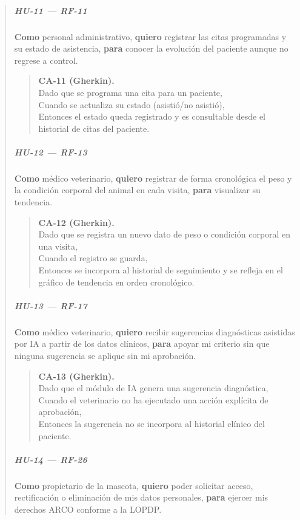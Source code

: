 \documentclass[
]{article}
\begin{document}
\begin{quote}
\subparagraph{HU-11 --- RF-11}
\textbf{Como} personal administrativo,
\textbf{quiero} registrar las citas programadas y su estado de asistencia,
\textbf{para} conocer la evolución del paciente aunque no regrese a control.

\begin{quote}
\textbf{CA-11 (Gherkin).} \\
Dado que se programa una cita para un paciente, \\
Cuando se actualiza su estado (asistió/no asistió), \\
Entonces el estado queda registrado y es consultable desde el historial de citas del paciente.
\end{quote}

\subparagraph{HU-12 --- RF-13}
\textbf{Como} médico veterinario,
\textbf{quiero} registrar de forma cronológica el peso y la condición corporal del animal en cada visita,
\textbf{para} visualizar su tendencia.

\begin{quote}
\textbf{CA-12 (Gherkin).} \\
Dado que se registra un nuevo dato de peso o condición corporal en una visita, \\
Cuando el registro se guarda, \\
Entonces se incorpora al historial de seguimiento y se refleja en el gráfico de tendencia en orden cronológico.
\end{quote}

\subparagraph{HU-13 --- RF-17}
\textbf{Como} médico veterinario,
\textbf{quiero} recibir sugerencias diagnósticas asistidas por IA a partir de los datos clínicos,
\textbf{para} apoyar mi criterio sin que ninguna sugerencia se aplique sin mi aprobación.

\begin{quote}
\textbf{CA-13 (Gherkin).} \\
Dado que el módulo de IA genera una sugerencia diagnóstica, \\
Cuando el veterinario no ha ejecutado una acción explícita de aprobación, \\
Entonces la sugerencia no se incorpora al historial clínico del paciente.
\end{quote}

\subparagraph{HU-14 --- RF-26}
\textbf{Como} propietario de la mascota,
\textbf{quiero} poder solicitar acceso, rectificación o eliminación de mis datos personales,
\textbf{para} ejercer mis derechos ARCO conforme a la LOPDP.


\end{quote}
\end{document}
